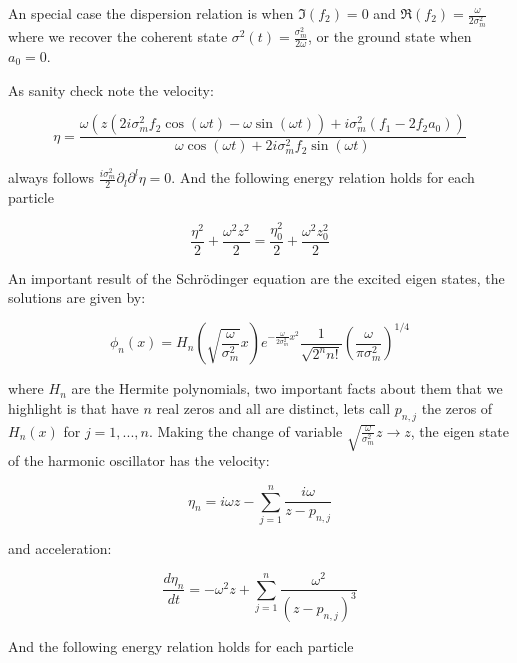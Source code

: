 \documentclass[a4paper,12pt]{article}
\begin{document}
An special case the dispersion relation is when $\Im(f_2)=0$ and $\Re(f_2) = \frac{\omega}{2\sigma_m^2}$ where we recover the coherent state $\sigma^2(t) = \frac{\sigma_m^2}{2\omega}$, or the ground state when $a_0=0$.

As sanity check note the velocity:

\begin{equation}
\eta = \frac{\omega\left(  z (  2i\sigma_m^2f_2 \cos(\omega t) - \omega \sin(\omega t)) + i \sigma_m^2(f_1 - 2f_2 a_0)  \right)}{\omega \cos(\omega t) + 2i\sigma_m^2f_2 \sin(\omega t)} 
\end{equation}

always follows $\frac{i\sigma_m^2}{2 } \partial_l \partial^l \eta = 0$. And the following energy relation holds for each particle

\begin{equation}
\frac{\eta^2}{2} + \frac{\omega^2 z^2}{2} = \frac{\eta_0^2}{2} + \frac{\omega^2 z_0^2}{2}
\end{equation}


An important result of the Schr\"odinger equation are the excited eigen states, the solutions are given by:

\begin{equation}
\phi_n(x) = H_n\left( \sqrt{\frac{\omega}{\sigma_m^2}}x \right) e^{-\frac{\omega}{2\sigma_m^2}x^2}
\frac{1}{\sqrt{2^n n!}}\left(\frac{\omega}{\pi \sigma_m^2} \right)^{1/4}
\end{equation}

where $H_n$ are the Hermite polynomials, two important facts about them that we highlight is that have $n$ real zeros and all are distinct, lets call $p_{n,j}$ the zeros of $H_n(x)$ for $j=1,...,n$. Making the change of variable $\sqrt{\frac{\omega}{\sigma_m^2}}z \rightarrow z$, the eigen state of the harmonic oscillator has the velocity:

\begin{equation}
\eta_n = i\omega z - \sum_{j=1}^{n} \frac{i \omega}{z - p_{n,j}}
\end{equation}

and acceleration:

\begin{equation}
\frac{d\eta_n}{dt} = -\omega^2 z + \sum_{j=1}^{n} \frac{\omega^2}{ \left( z - p_{n,j} \right)^3}
\end{equation}

And the following energy relation holds for each particle
\end{document}
